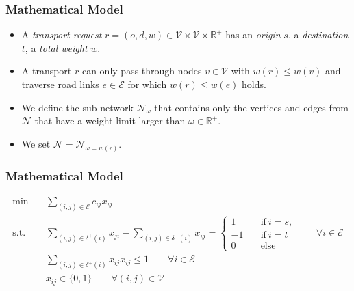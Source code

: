 \documentclass{beamer}   %
\newcommand{\RNum}[1]{\uppercase\expandafter{\romannumeral #1\relax}}
\theoremstyle{break}
\begin{document}
  \begin{frame}
    \frametitle{Mathematical Model \RNum{2}}

    \begin{itemize}
      \item
      A \emph{transport request} $r=(o,d,w) \in \mathcal{V} \times \mathcal{V} \times \mathbb{R}^{+}$
      has an \emph{origin} $s$, a \emph{destination} $t$, a \emph{total weight} $w$.

      \item A transport $r$ can only pass through nodes $v \in \mathcal{V}$ with
      $w(r) \leq w(v)$ and traverse road links $e \in \mathcal{E}$ for which $w(r) \leq w(e)$ holds.

      \item We define the sub-network $\mathcal{N}_{\omega}$ that contains only the vertices and edges from $\mathcal{N}$ that have a weight limit larger than $\omega \in \mathbb{R}^{+}$.

      \item We set $\mathcal{N}=\mathcal{N}_{\omega=w(r)}$.
    \end{itemize}

  \end{frame}



  \begin{frame}
    \frametitle{Mathematical Model \RNum{3}}
    \begin{align}
      \min \quad &\sum_{(i,j)\in \mathcal{E}}  c_{ij} x_{ij} \label{obj} \\
      \text{s.t.}\quad &
      \sum_{(i,j)\in \delta^{+} (i)} x_{ji} - \sum_{(i,j)\in \delta^{-}(i)} x_{ij} =
      \begin{cases}
        1 \quad& \text{if}~ i=s, \\
        -1 \quad& \text{if}~ i=t \\
        0 \quad&\text{else}
      \end{cases}
      \qquad \forall i \in \mathcal{E}
      \\
      &  \sum_{(i,j)\in \delta^{+} (i)} x_{ij}   x_ {ij} \leq 1     \qquad \forall i \in \mathcal{E}\\
      &  x_{ij} \in \{0,1\}   \qquad \forall (i,j) \in \mathcal{V}
    \end{align}
  \end{frame}
\end{document}
